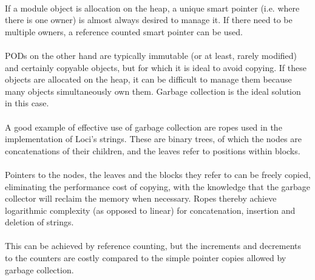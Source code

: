 \documentclass[12pt,twoside,notitlepage]{report}
\begin{document}
\paragraph{}
If a module object is allocation on the heap, a unique smart pointer (i.e. where there is one owner) is almost always desired to manage it. If there need to be multiple owners, a reference counted smart pointer can be used.

\paragraph{}
PODs on the other hand are typically immutable (or at least, rarely modified) and certainly copyable objects, but for which it is ideal to avoid copying. If these objects are allocated on the heap, it can be difficult to manage them because many objects simultaneously own them. Garbage collection is the ideal solution in this case.

\paragraph{}
A good example of effective use of garbage collection are ropes used in the implementation of Loci's strings. These are binary trees, of which the nodes are concatenations of their children, and the leaves refer to positions within blocks.

\paragraph{}
Pointers to the nodes, the leaves and the blocks they refer to can be freely copied, eliminating the performance cost of copying, with the knowledge that the garbage collector will reclaim the memory when necessary. Ropes thereby achieve logarithmic complexity (as opposed to linear) for concatenation, insertion and deletion of strings.

\paragraph{}
This can be achieved by reference counting, but the increments and decrements to the counters are costly compared to the simple pointer copies allowed by garbage collection.
\end{document}
